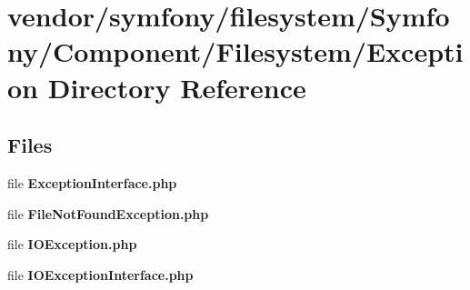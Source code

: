 \section{vendor/symfony/filesystem/\+Symfony/\+Component/\+Filesystem/\+Exception Directory Reference}
\label{dir_0dc45593eac6cc5ad44cfdccd0dfa6c9}
\subsection*{Files}
\begin{DoxyCompactItemize}
\item 
file {\bf Exception\+Interface.\+php}
\item 
file {\bf File\+Not\+Found\+Exception.\+php}
\item 
file {\bf I\+O\+Exception.\+php}
\item 
file {\bf I\+O\+Exception\+Interface.\+php}
\end{DoxyCompactItemize}
